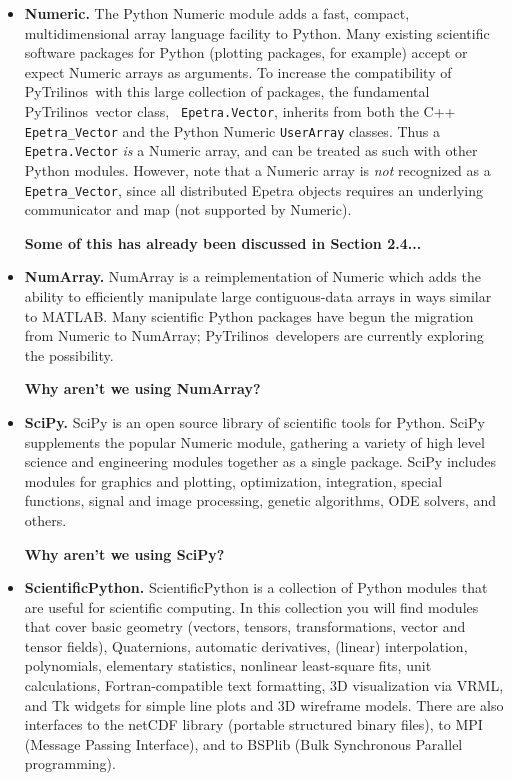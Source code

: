 \documentclass[acmtocl]{acmtrans2m}
\newcommand{\PyTrilinos}{{PyTrilinos}}
\begin{document}
\begin{itemize}

\item {\bf Numeric.} The Python Numeric module adds a fast, compact,
  multidimensional array language facility to Python.  Many existing
  scientific software packages for Python (plotting packages, for
  example) accept or expect Numeric arrays as arguments.  To increase
  the compatibility of \PyTrilinos\ with this large collection of
  packages, the fundamental \PyTrilinos\ vector class, {\tt
    Epetra.Vector}, inherits from both the C++ {\tt Epetra\_Vector}
  and the Python Numeric {\tt UserArray} classes.  Thus a {\tt
    Epetra.Vector} {\sl is} a Numeric array, and can be treated as
  such with other Python modules.  However, note that a Numeric array
  is {\sl not} recognized as a {\tt Epetra\_Vector}, since all
  distributed Epetra objects requires an underlying communicator and
  map (not supported by Numeric).

  {\bf Some of this has already been discussed in Section 2.4...}

\item {\bf NumArray.}  NumArray is a reimplementation of Numeric which
  adds the ability to efficiently manipulate large contiguous-data
  arrays in ways similar to MATLAB.  Many scientific Python packages
  have begun the migration from Numeric to NumArray; \PyTrilinos\
  developers are currently exploring the possibility.

  {\bf Why aren't we using NumArray?}

\item {\bf SciPy.} SciPy is an open source library of scientific tools
  for Python. SciPy supplements the popular Numeric module, gathering
  a variety of high level science and engineering modules together as
  a single package. SciPy includes modules for graphics and plotting,
  optimization, integration, special functions, signal and image
  processing, genetic algorithms, ODE solvers, and others.

  {\bf Why aren't we using SciPy?}

\item {\bf ScientificPython.}  ScientificPython is a collection of
  Python modules that are useful for scientific computing. In this
  collection you will find modules that cover basic geometry (vectors,
  tensors, transformations, vector and tensor fields), Quaternions,
  automatic derivatives, (linear) interpolation, polynomials,
  elementary statistics, nonlinear least-square fits, unit
  calculations, Fortran-compatible text formatting, 3D visualization
  via VRML, and Tk widgets for simple line plots and 3D wireframe
  models. There are also interfaces to the netCDF library (portable
  structured binary files), to MPI (Message Passing Interface), and to
  BSPlib (Bulk Synchronous Parallel programming).


\end{itemize}
\end{document}
